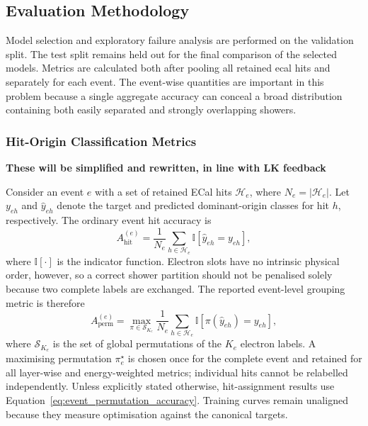 \subsection{Evaluation Methodology}
\label{sec:method_evaluation}

Model selection and exploratory failure analysis are performed on the
validation split. The test split remains held out for the final comparison of
the selected models. Metrics are calculated both after pooling all retained
\gls{ecal} hits and separately for each event. The event-wise quantities are
important in this problem because a single aggregate accuracy can conceal a
broad distribution containing both easily separated and strongly overlapping
showers.

\subsubsection{Hit-Origin Classification Metrics}

\textbf{These will be simplified and rewritten, in line with LK feedback}

Consider an event \(e\) with a set of retained ECal hits
\(\mathcal{H}_e\), where \(N_e=|\mathcal{H}_e|\). Let \(y_{eh}\) and
\(\widehat{y}_{eh}\) denote the target and predicted dominant-origin classes
for hit \(h\), respectively. The ordinary event hit accuracy is
\begin{equation}
    A_{\mathrm{hit}}^{(e)}
    =
    \frac{1}{N_e}
    \sum_{h \in \mathcal{H}_e}
    \mathbb{I}
    \!\left[\widehat{y}_{eh}=y_{eh}\right],
    \label{eq:event_hit_accuracy}
\end{equation}
where \(\mathbb{I}[\cdot]\) is the indicator function. Electron slots have no
intrinsic physical order, however, so a correct shower partition should not be
penalised solely because two complete labels are exchanged. The reported
event-level grouping metric is therefore
\begin{equation}
    A_{\mathrm{perm}}^{(e)}
    =
    \max_{\pi\in\mathcal{S}_{K_e}}
    \frac{1}{N_e}
    \sum_{h\in\mathcal{H}_e}
    \mathbb{I}
    \!\left[\pi(\widehat y_{eh})=y_{eh}\right],
    \label{eq:event_permutation_accuracy}
\end{equation}
where \(\mathcal{S}_{K_e}\) is the set of global permutations of the
\(K_e\) electron labels. A maximising permutation \(\pi_e^\star\) is chosen
once for the complete event and retained for all layer-wise and
energy-weighted metrics; individual hits cannot be relabelled independently.
Unless explicitly stated otherwise, hit-assignment results use
Equation~\eqref{eq:event_permutation_accuracy}. Training curves remain
unaligned because they measure optimisation against the canonical targets.

